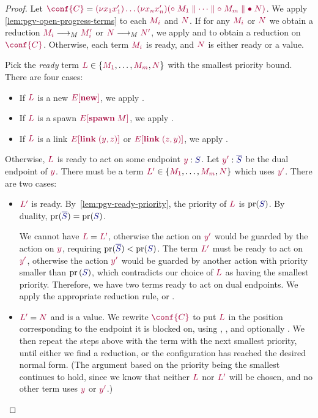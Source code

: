 \begin{proof}
  \label{prf:thm-pgv-closed-progress-confs}
  Let $\tm{\conf{C}}=\tm{\res{x_1}{x'_1}{\dots\res{x_n}{x'_n}{(\child\;M_1\parallel\dots\parallel\child\;M_m\parallel\main\;N)}}}$.
  We apply \cref{lem:pgv-open-progress-terms} to each $\tm{M_i}$ and $\tm{N}$. If for any $\tm{M_i}$ or $\tm{N}$ we obtain a reduction $\tm{M_i}\tred\tm{M'_i}$ or $\tm{N}\tred\tm{N'}$, we apply  and  to obtain a reduction on $\tm{\conf{C}}$.
  Otherwise, each term $\tm{M_i}$ is ready, and $\tm{N}$ is either ready or a value.

  Pick the \emph{ready} term $\tm{L}\in\{\tm{M_1},\dots,\tm{M_m},\tm{N}\}$ with the smallest priority bound. There are four cases:
  \begin{itemize}
  \item
    If $\tm{L}$ is a new $\tm{\plug{E}{\new}}$, we apply .
  \item
    If $\tm{L}$ is a spawn $\tm{\plug{E}{\spawn\;M}}$, we apply .
  \item
    If $\tm{L}$ is a link $\tm{\plug{E}{\link\;\pair{y}{z}}}$ or $\tm{\plug{E}{\link\;\pair{z}{y}}}$, we apply .
  \end{itemize}
  Otherwise, $\tm{L}$ is ready to act on some endpoint $\tmty{y}{S}$. Let $\tmty{y'}{\co{S}}$ be the dual endpoint of $\tm{y}$. There must be a term $\tm{L'}\in\{\tm{M_1},\dots,\tm{M_m},\tm{N}\}$ which uses $\tm{y'}$. There are two cases:
  \begin{itemize}
  \item
    $\tm{L'}$ is ready. By~\cref{lem:pgv-ready-priority}, the priority of $\tm{L}$ is $\pr(\ty{S})$. By duality, $\pr(\ty{\co{S}})=\pr(\ty{S})$.

    We cannot have $\tm{L}=\tm{L'}$, otherwise the action on $\tm{y'}$ would be guarded by the action on $\tm{y}$, requiring $\pr(\ty{\co{S}})<\pr(\ty{S})$. The term $\tm{L'}$ must be ready to act on $\tm{y'}$, otherwise the action $\tm{y'}$ would be guarded by another action with priority smaller than $\pr{(\ty{S})}$, which contradicts our choice of $\tm{L}$ as having the smallest priority. Therefore, we have two terms ready to act on dual endpoints. We apply the appropriate reduction rule, \ie {} or .
  \item
    $\tm{L'}=\tm{N}$ and is a value. We rewrite $\tm{\conf{C}}$ to put $\tm{L}$ in the position corresponding to the endpoint it is blocked on, using , , and optionally . We then repeat the steps above with the term with the next smallest priority, until either we find a reduction, or the configuration has reached the desired normal form. (The argument based on the priority being the smallest continues to hold, since we know that neither $\tm{L}$ nor $\tm{L'}$ will be chosen, and no other term uses $\tm{y}$ or $\tm{y'}$.)
  \end{itemize} 
\end{proof}

